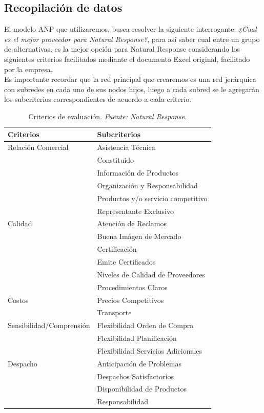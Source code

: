 \documentclass[12pt,letterpaper]{article}
\begin{document}
\subsection{Recopilación de datos}
El modelo ANP que utilizaremos, busca resolver la siguiente interrogante: \textit{¿Cual es el mejor proveedor para Natural Response?}, para así saber cual entre un grupo de alternativas, es la mejor opción para Natural Response considerando los siguientes criterios facilitados mediante el documento Excel original, facilitado por la empresa.\\
Es importante recordar que la red principal que crearemos es una red jerárquica con subredes en cada uno de sus nodos hijos, luego a cada subred se le agregarán los subcriterios correspondientes de acuerdo a cada criterio.

\begin{table}[h]
\centering
\begin{tabular}{|l|l|}
\hline
Criterios & Subcriterios \\
\hline
\multirow{1}{*}{Relación Comercial}
 & Asistencia Técnica \\
 & Constituido \\
 & Información de Productos \\
 & Organización y Responsabilidad \\
 & Productos y/o servicio competitivo \\
 & Representante Exclusivo\\
\hline
\multirow{1}{*}{Calidad}
 & Atención de Reclamos \\
 & Buena Imágen de Mercado \\
 & Certificación \\
 & Emite Certificados \\
 & Niveles de Calidad de Proveedores \\
 & Procedimientos Claros\\
\hline
\multirow{1}{*}{Costos}
 & Precios Competitivos \\
 & Transporte \\
\hline
\multirow{1}{*}{Sensibilidad/Comprensión}
 & Flexibilidad Orden de Compra \\
 & Flexibilidad Planificación \\
 & Flexibilidad Servicios Adicionales \\ 
\hline
\multirow{1}{*}{Despacho}
 & Anticipación de Problemas \\
 & Despachos Satisfactorios \\
 & Disponibilidad de Productos \\ 
 & Responsabilidad \\
\hline
\end{tabular}
\caption{Criterios de evaluación. \textit{Fuente: Natural Response.}}
\label{tab:criterios}
\end{table}
\newpage
\end{document}
